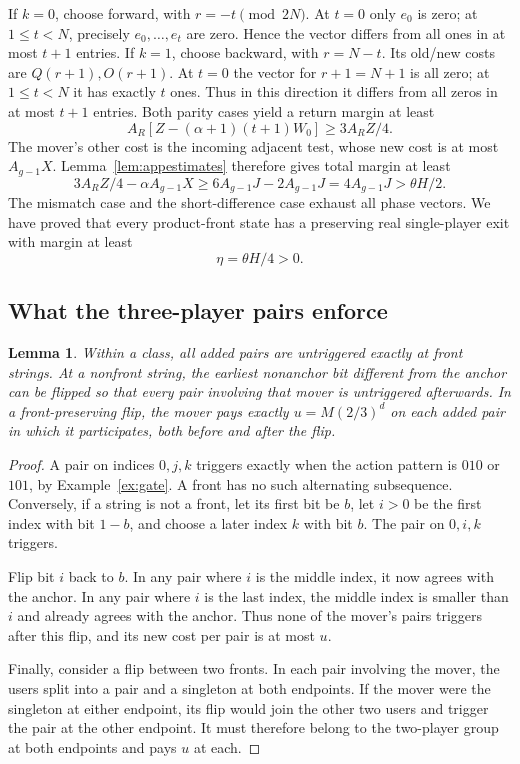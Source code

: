 \documentclass[11pt]{article}
\newtheorem{lemma}[theorem]{Lemma}
\theoremstyle{definition}
\begin{document}
If $k=0$, choose forward, with $r=-t\pmod{2N}$. At $t=0$ only $e_0$ is zero; at $1\le t<N$, precisely $e_0,\ldots,e_t$ are zero. Hence the vector differs from all ones in at most $t+1$ entries. If $k=1$, choose backward, with $r=N-t$. Its old/new costs are $Q(r+1),O(r+1)$. At $t=0$ the vector for $r+1=N+1$ is all zero; at $1\le t<N$ it has exactly $t$ ones. Thus in this direction it differs from all zeros in at most $t+1$ entries. Both parity cases yield a return margin at least
\begin{equation}\label{eq:appreturnmargin}
 A_R[Z-(\alpha+1)(t+1)W_0]\ge3A_RZ/4.
\end{equation}
The mover's other cost is the incoming adjacent test, whose new cost is at most $A_{g-1}X$. Lemma~\ref{lem:appestimates} therefore gives total margin at least
\begin{equation}\label{eq:appfinalfrontmargin}
 3A_RZ/4-\alpha A_{g-1}X
 \ge6A_{g-1}J-2A_{g-1}J
 =4A_{g-1}J>\theta H/2.
\end{equation}
The mismatch case and the short-difference case exhaust all phase vectors. We have proved that every product-front state has a preserving real single-player exit with margin at least
\begin{equation}\label{eq:appeta}
 \eta=\theta H/4>0.
\end{equation}


\subsection{What the three-player pairs enforce}\label{sec:repair}
\begin{lemma}\label{lem:gates}
Within a class, all added pairs are untriggered exactly at front strings. At a nonfront string, the earliest nonanchor bit different from the anchor can be flipped so that every pair involving that mover is untriggered afterwards. In a front-preserving flip, the mover pays exactly $u=M(2/3)^d$ on each added pair in which it participates, both before and after the flip.
\end{lemma}
\begin{proof}
A pair on indices $0,j,k$ triggers exactly when the action pattern is $010$ or $101$, by Example~\ref{ex:gate}. A front has no such alternating subsequence. Conversely, if a string is not a front, let its first bit be $b$, let $i>0$ be the first index with bit $1-b$, and choose a later index $k$ with bit $b$. The pair on $0,i,k$ triggers.

Flip bit $i$ back to $b$. In any pair where $i$ is the middle index, it now agrees with the anchor. In any pair where $i$ is the last index, the middle index is smaller than $i$ and already agrees with the anchor. Thus none of the mover's pairs triggers after this flip, and its new cost per pair is at most $u$.

Finally, consider a flip between two fronts. In each pair involving the mover, the users split into a pair and a singleton at both endpoints. If the mover were the singleton at either endpoint, its flip would join the other two users and trigger the pair at the other endpoint. It must therefore belong to the two-player group at both endpoints and pays $u$ at each.
\end{proof}
\end{document}
